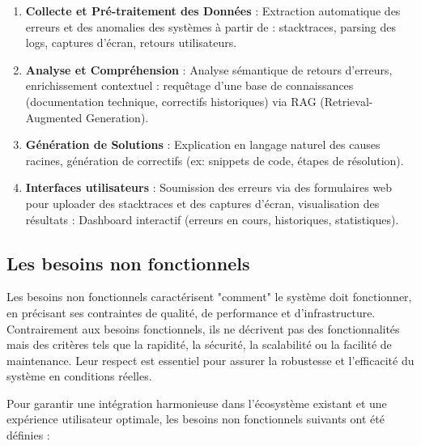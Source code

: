 \documentclass[12pt,a4paper]{report}
\begin{document}
	\begin{enumerate}
		
		\item \textbf{Collecte et Pré-traitement des Données} : Extraction automatique des erreurs et des anomalies des systèmes à partir de :
		stacktraces, parsing des logs, captures d’écran, retours utilisateurs.
		
		\item \textbf{Analyse et Compréhension} : Analyse sémantique de retours d’erreurs, enrichissement contextuel : requêtage d’une base de connaissances (documentation technique, correctifs historiques) via RAG (Retrieval-Augmented Generation).
		
		\item \textbf{Génération de Solutions} : Explication en langage naturel des causes racines, génération de correctifs (ex: snippets de code, étapes de résolution).
		
		\item \textbf{Interfaces utilisateurs} : Soumission des erreurs via des formulaires web pour uploader des stacktraces et des captures d'écran, visualisation des résultats : Dashboard interactif (erreurs en cours, historiques, statistiques).

	\end{enumerate}
	
	\subsection{Les besoins non fonctionnels}
	
	Les besoins non fonctionnels caractérisent "comment" le système doit fonctionner, en précisant ses contraintes de qualité, de performance et d’infrastructure. Contrairement aux besoins fonctionnels, ils ne décrivent pas des fonctionnalités mais des critères tels que la rapidité, la sécurité, la scalabilité ou la facilité de maintenance. Leur respect est essentiel pour assurer la robustesse et l’efficacité du système en conditions réelles.
	
	Pour garantir une intégration harmonieuse dans l’écosystème existant et une expérience utilisateur optimale, les besoins non fonctionnels suivants ont été définies :
	
\end{document}
